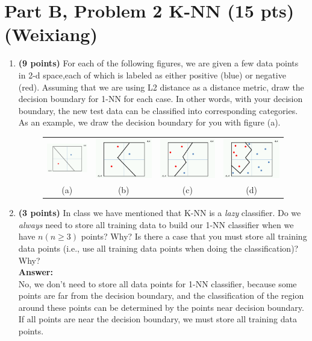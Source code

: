 
\section*{Part B, Problem 2 K-NN (15 pts) (Weixiang)}
\begin{enumerate}
	\item \textbf{(9 points)}
	For each of the following figures, we are given a few data points in
	2-d space,each of which is labeled as either positive (blue) or
	negative (red). Assuming that we are using L2 distance as a distance
	metric, draw the decision boundary for 1-NN for each case. In other words, with your decision boundary, the new test data can be classified into corresponding categories. As an example, we draw the decision boundary for you with figure (a).
	
	\begin{figure}[h!]
		\centering
		\begin{tabular}{cccc}
			\includegraphics[width=.25\columnwidth]{pa.png}& \includegraphics[width=.25\columnwidth]{pb.png}& \includegraphics[width=.25\columnwidth]{pc.png}&
			\includegraphics[width=.25\columnwidth]{pd.png}\\
			(a) & (b) & (c) & (d)
		\end{tabular}
	\end{figure}
	
	
	\item \textbf{(3 points)} In class we have mentioned that K-NN is a \emph{lazy}
	classifier. Do we \emph{always} need to store all training data to build our 1-NN classifier when we have $n (n\geq3)$ points? Why? Is there a case that you must store all training data points (i.e., use all training data points when doing the classification)? Why?
	\\\textbf{Answer:}\\
	No, we don't need to store all data points for 1-NN classifier, because some points are far from the decision boundary, and the classification of the region around these points can be determined by the points near decision boundary. If all points are near the decision boundary, we must store all training data points.
	

\end{enumerate}
